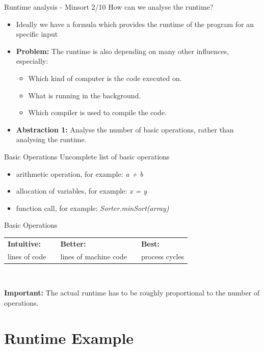 \documentclass{beamer}
\begin{document}
\begin{frame}{Runtime analysis - Minsort 2/10}
  How can we analyse the runtime?
  \begin{itemize}
    \item Ideally we have a formula which provides the runtime of the
      program for an specific input
    \item
      \textbf{Problem:} The runtime is also depending on many other
        influences, especially:
      \begin{itemize}
        \item
          Which kind of computer is the code executed on.
        \item What is running in the background.
        \item Which compiler is used to compile the code.
      \end{itemize}
    \item
      \textbf{Abstraction 1:} Analyse the number of basic operations,
        rather than analysing the runtime.
  \end{itemize}
\end{frame}

\begin{frame}{Basic Operations}
  Uncomplete list of basic operations
  \begin{center}
    \begin{itemize}
      \item
        arithmetic operation, for example: \textit{a + b}
      \item
        allocation of variables, for example: \textit{x = y}
      \item 
        function call, for example: \textit{Sorter.minSort(array)}
    \end{itemize}
  \end{center}
\end{frame}


\begin{frame}{Basic Operations}
  \begin{tabularx}{\textwidth}{@{}XcXcX@{}}
    \cellcolor{Mittel-Blau} {\color{white}\textbf{Intuitive:}} &
    {} &
    \cellcolor{Mittel-Blau} {\color{white}\textbf{Better:}} &
    {} &
    \cellcolor{Mittel-Blau} {\color{white}\textbf{Best:}}\\[0.5em]
    \rule{0pt}{1.25em}\cellcolor{Hell-Blau}lines of code &
    {} &
    \cellcolor{Hell-Blau}lines of machine code &
    {} &
    \cellcolor{Hell-Blau}process cycles
  \end{tabularx}\\[1.5em]
  \begin{alertblock}{\textbf{Important:}}
    The actual runtime has to be roughly proportional
    to the number of operations.
  \end{alertblock}
\end{frame}\section{Runtime Example}
\end{document}
